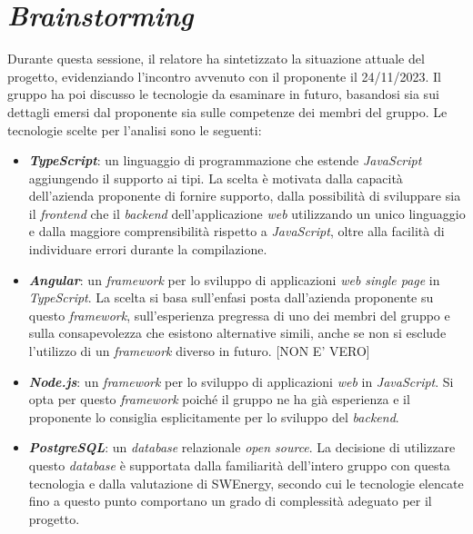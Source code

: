 \section{\textit{Brainstorming}}

Durante questa sessione, il relatore ha sintetizzato la situazione attuale del
progetto, evidenziando l'incontro avvenuto con il proponente il 24/11/2023. Il
gruppo ha poi discusso le tecnologie da esaminare in futuro, basandosi sia sui
dettagli emersi dal proponente sia sulle competenze dei membri del gruppo. Le
tecnologie scelte per l'analisi sono le
seguenti:

\begin{itemize}
	\item \textbf{\textit{TypeScript}}: un linguaggio di programmazione che
	      estende \textit{JavaScript} aggiungendo il supporto ai tipi. La scelta è
	      motivata dalla capacità dell'azienda proponente di fornire supporto, dalla
	      possibilità di sviluppare sia il \textit{frontend} che il \textit{backend}
	      dell'applicazione \textit{web} utilizzando un unico linguaggio e dalla
	      maggiore comprensibilità rispetto a \textit{JavaScript}, oltre alla facilità
	      di individuare errori durante la
	      compilazione.

	\item \textbf{\textit{Angular}}: un \textit{framework} per lo sviluppo di
	      applicazioni \textit{web single page} in \textit{TypeScript}. La scelta si
	      basa sull'enfasi posta dall'azienda proponente su questo \textit{framework},
	      sull'esperienza pregressa di uno dei membri del gruppo e sulla consapevolezza
	      che esistono alternative simili, anche se non si esclude l'utilizzo di un
	      \textit{framework} diverso in futuro. [NON E' VERO]

	\item \textbf{\textit{Node.js}}: un \textit{framework} per lo sviluppo di
	      applicazioni \textit{web} in \textit{JavaScript}. Si opta per questo
	      \textit{framework} poiché il gruppo ne ha già esperienza e il
	      proponente lo consiglia esplicitamente per lo sviluppo del
	      \textit{backend}.

	\item \textbf{\textit{PostgreSQL}}: un \textit{database} relazionale
	      \textit{open source}. La decisione di utilizzare questo
	      \textit{database} è supportata dalla familiarità dell'intero gruppo con
	      questa tecnologia e dalla valutazione di SWEnergy, secondo cui le tecnologie
	      elencate fino a questo punto comportano un grado di complessità adeguato per
	      il progetto.
\end{itemize}

